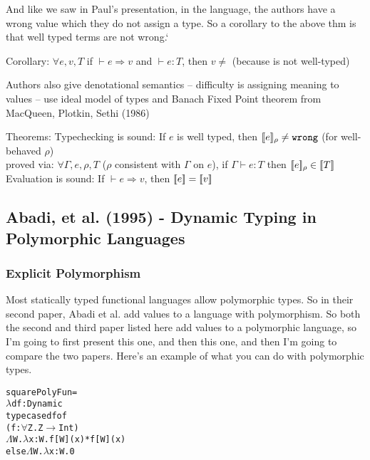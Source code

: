 \documentclass[12pt]{article}	%
\begin{document}
And like we saw in Paul's presentation, in the language, the authors have a wrong value which they do not assign a type. So a corollary to the above thm is that well typed terms are not wrong.`

Corollary: $\forall e, v, T$ if $\vdash e \Rightarrow v$ and $\vdash e:T$, then $v \neq$ \wrong (because \wrong is not well-typed)

Authors also give denotational semantics -- difficulty is assigning meaning to \Dynamic values -- use ideal model of types and Banach Fixed Point theorem from MacQueen, Plotkin, Sethi (1986)

Theorems: Typechecking is sound: If $e$ is well typed, then $[\![e]\!]_\rho \neq \texttt{wrong}$ (for well-behaved $\rho$)\\
	                             proved via: $\forall\Gamma,e,\rho,T$ ($\rho$ consistent with $\Gamma$ on $e$), if $\Gamma\vdash e:T$ then $[\![e]\!]_\rho \in [\![T]\!]$\\
	      Evaluation is sound: If $\vdash e \Rightarrow v$, then $[\![e]\!] = [\![v]\!]$



\subsection*{Abadi, et al. (1995) - Dynamic Typing in Polymorphic Languages}

\subsubsection*{Explicit Polymorphism}
Most statically typed functional languages allow polymorphic types. So in their second paper, Abadi et al. add \Dynamic values to a language with polymorphism. So both the second and third paper listed here add \Dynamic values to a polymorphic language, so I'm going to first present this one, and then this one, and then I'm going to compare the two papers. Here's an example of what you can do with polymorphic types. 

\begin{alltt}
squarePolyFun = 
  \(\lambda\)df:Dynamic
    typecase df of
      (f:\(\forall\)Z.Z\(\rightarrow\)Int)
        \(\Lambda\)W.\(\lambda\)x:W.f[W](x)*f[W](x)
      else \(\Lambda\)W.\(\lambda\)x:W.0
\end{alltt}
\end{document}
